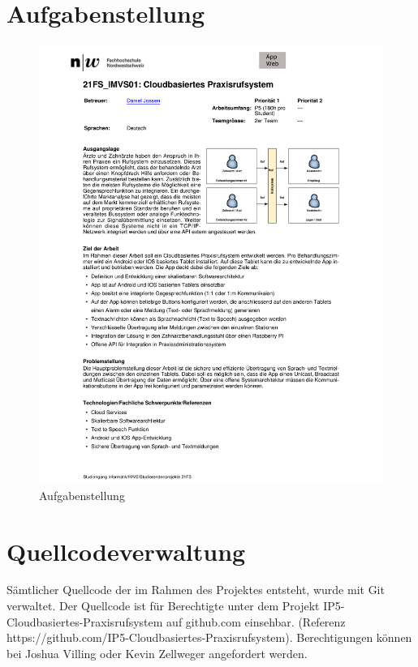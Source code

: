 \renewcommand\refname{Literaturverzeichnis}
\printbibliography
\cleardoublepage
\listoffigures

\appendix

\section{Aufgabenstellung}
\begin{figure}[h]
    \centering
    \begin{minipage}[b]{0.8\textwidth}
        \includegraphics[width=\textwidth]{graphics/aufgabenstellung}
        \caption{Aufgabenstellung}
    \end{minipage}
\end{figure}

\clearpage

\section{Quellcodeverwaltung}

Sämtlicher Quellcode der im Rahmen des Projektes entsteht, wurde mit Git verwaltet. Der Quellcode ist für Berechtigte unter dem Projekt IP5-Cloudbasiertes-Praxisrufsystem auf github.com einsehbar.
(Referenz https://github.com/IP5-Cloudbasiertes-Praxisrufsystem). Berechtigungen können bei Joshua Villing oder Kevin Zellweger angefordert werden.

\clearpage




\clearpage



